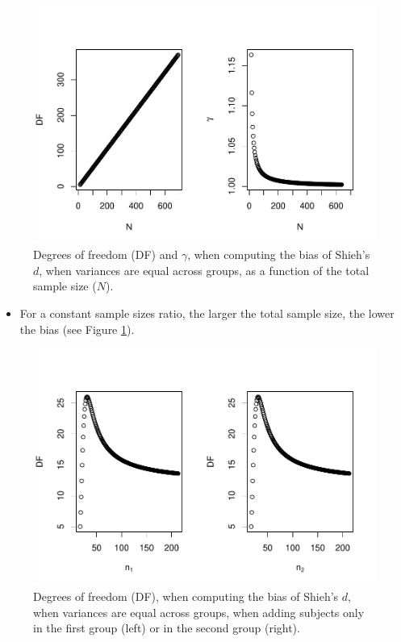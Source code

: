\documentclass[
  english,
  man,mask]{apa6}
\providecommand{\tightlist}{%
  \setlength{\itemsep}{0pt}\setlength{\parskip}{0pt}}
\begin{document}
\begin{figure}
\centering
\includegraphics{Theoretical-Bias-of-all-estimators-as-a-function-of-population-parameters_files/figure-latex/biasshiehhomNsize2-1.pdf}
\caption{\label{fig:biasshiehhomNsize2}Degrees of freedom (DF) and \(\gamma\), when computing the bias of Shieh's \(d\), when variances are equal across groups, as a function of the total sample size (\(N\)).}
\end{figure}

\begin{itemize}
\tightlist
\item
  For a constant sample sizes ratio, the larger the total sample size, the lower the bias (see Figure \ref{fig:biasshiehhomNsize2}).
\end{itemize}

\begin{figure}
\centering
\includegraphics{Theoretical-Bias-of-all-estimators-as-a-function-of-population-parameters_files/figure-latex/biasshiehhomuneqNsize2-1.pdf}
\caption{\label{fig:biasshiehhomuneqNsize2}Degrees of freedom (DF), when computing the bias of Shieh's \(d\), when variances are equal across groups, when adding subjects only in the first group (left) or in the second group (right).}
\end{figure}
\end{document}
